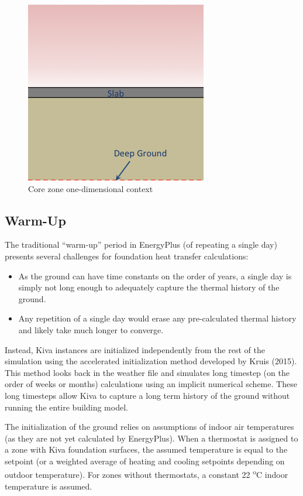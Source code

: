 \begin{figure}
\centering
\includegraphics{media/kiva-core-zone-1d.png}
\caption{Core zone one-dimensional context\label{fig:cz-1}}
\end{figure}

\subsection{Warm-Up}

The traditional ``warm-up'' period in EnergyPlus (of repeating a single
day) presents several challenges for foundation heat transfer
calculations:

\begin{itemize}
\tightlist
\item
  As the ground can have time constants on the order of years, a single
  day is simply not long enough to adequately capture the thermal
  history of the ground.
\item
  Any repetition of a single day would erase any pre-calculated thermal
  history and likely take much longer to converge.
\end{itemize}

Instead, Kiva instances are initialized independently from the rest of the simulation using the accelerated initialization method developed by Kruis (2015). This method looks back in the weather file and simulates long timestep (on the order of weeks or months) calculations using an implicit numerical scheme. These long timesteps allow Kiva to capture a long term history of the ground without running the entire building model.

The initialization of the ground relies on assumptions of indoor air temperatures (as they are not yet calculated by EnergyPlus). When a thermostat is assigned to a zone with Kiva foundation surfaces, the assumed temperature is equal to the setpoint (or a weighted average of heating and cooling setpoints depending on outdoor temperature). For zones without thermostats, a constant 22 \textsuperscript{o}C indoor temperature is assumed.

